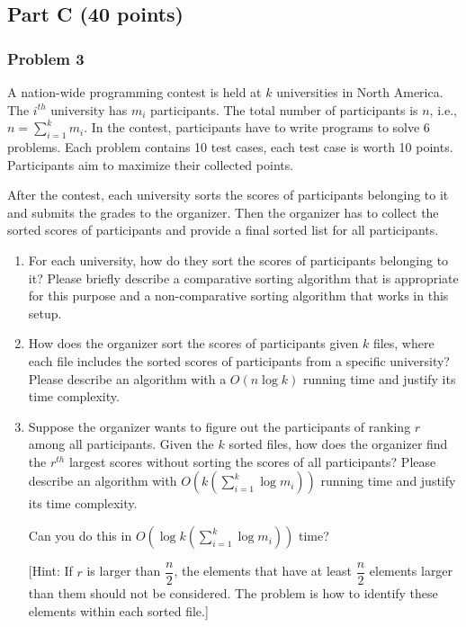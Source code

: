 \documentclass[11pt]{article}
\begin{document}
\subsection*{Part C (40 points)}

\subsubsection*{Problem 3} 

A nation-wide programming contest is held
at $k$ universities in North America. The $i^{th}$ university has
$m_{i}$ participants. The total number of participants is $n$, i.e.,
$n = \sum_{i=1}^{k}m_{i}$. In the contest, participants have to write
programs to solve 6 problems. Each problem contains 10 test cases,
each test case is worth 10 points. Participants aim to maximize their
collected points.  

After the contest, each university sorts the scores of participants
belonging to it and submits the grades to the organizer.  Then the
organizer has to collect the sorted scores of participants and provide
a final sorted list for all participants.

\begin{enumerate}

\item For each university, how do they sort the scores of participants
  belonging to it? Please briefly describe a comparative sorting
  algorithm that is appropriate for this purpose and a non-comparative
  sorting algorithm that works in this setup.

\item How does the organizer sort the scores of participants given $k$
  files, where each file includes the sorted scores of participants
  from a specific university?  Please describe an algorithm with a
  $O(n\log k)$ running time and justify its time complexity.

\item Suppose the organizer wants to figure out the participants of
  ranking $r$ among all participants. Given the $k$ sorted files, how
  does the organizer find the $r^{th}$ largest scores without sorting
  the scores of all participants?  Please describe an algorithm with
  $O(k (\sum_{i=1}^{k}\log m_{i}) )$ running time and justify its time
  complexity. 

Can you do this in $O(\log k(\sum_{i=1}^{k}\log m_{i}))$ time?

[Hint: If $r$ is larger than $\dfrac{n}{2}$, the elements that have at
  least $\dfrac{n}{2}$ elements larger than them should not be
  considered. The problem is how to identify these elements within
  each sorted file.]\\
  

\end{enumerate}
\end{document}
